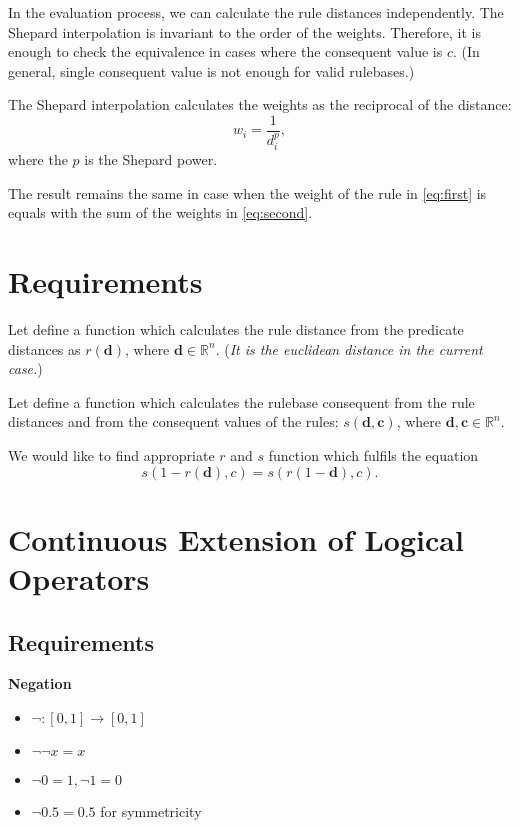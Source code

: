 \documentclass[a4paper,12pt]{article}
\begin{document}
In the evaluation process, we can calculate the rule distances independently. The Shepard interpolation is invariant to the order of the weights. Therefore, it is enough to check the equivalence in cases where the consequent value is $c$. (In general, single consequent value is not enough for valid rulebases.)

The Shepard interpolation calculates the weights as the reciprocal of the distance:
$$
w_i = \dfrac{1}{d_{i}^p},
$$
where the $p$ is the Shepard power.


The result remains the same in case when the weight of the rule in \ref{eq:first} is equals with the sum of the weights in \ref{eq:second}.

\section{Requirements}

Let define a function which calculates the rule distance from the predicate distances as $r(\textbf{d})$, where $\textbf{d} \in \mathbb{R}^n$. (\textit{It is the euclidean distance in the current case.})

Let define a function which calculates the rulebase consequent from the rule distances and from the consequent values of the rules: $s(\textbf{d}, \textbf{c})$, where $\textbf{d}, \textbf{c} \in \mathbb{R}^n$.

We would like to find appropriate $r$ and $s$ function which fulfils the equation
\begin{equation}
s(1 - r(\textbf{d}), c) = s(r(1 - \textbf{d}), c).
\end{equation}

\section{Continuous Extension of Logical Operators}

\subsection{Requirements}

\noindent \textbf{Negation}
\begin{itemize}
\item $\neg: [0, 1] \rightarrow [0, 1]$
\item $\neg \neg x = x$
\item $\neg 0 = 1, \neg 1 = 0$
\item $\neg 0.5 = 0.5$ for symmetricity
\end{itemize}
\end{document}

